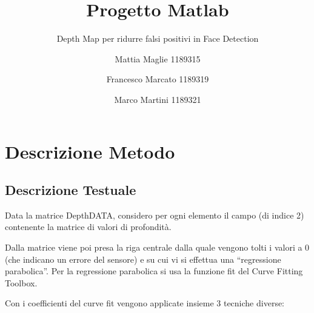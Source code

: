 \documentclass[
  italian,
]{article}
\title{Progetto Matlab}
\subtitle{Depth Map per ridurre falsi positivi in Face Detection}
\author{Mattia Maglie 1189315 \and Francesco Marcato 1189319 \and Marco
Martini 1189321}
\date{}
\begin{document}
\maketitle

\hypertarget{descrizione-metodo}{%
\section{Descrizione Metodo}\label{descrizione-metodo}}

\hypertarget{descrizione-testuale}{%
\subsection{Descrizione Testuale}\label{descrizione-testuale}}

Data la matrice DepthDATA, considero per ogni elemento il campo (di
indice 2) contenente la matrice di valori di profondità.

Dalla matrice viene poi presa la riga centrale dalla quale vengono tolti i valori a 0 (che indicano un errore del sensore) e su cui vi si effettua
una ``regressione parabolica''. Per la
regressione parabolica si usa la funzione fit del Curve Fitting Toolbox.

Con i coefficienti del curve fit vengono applicate insieme 3 tecniche diverse:
\end{document}
